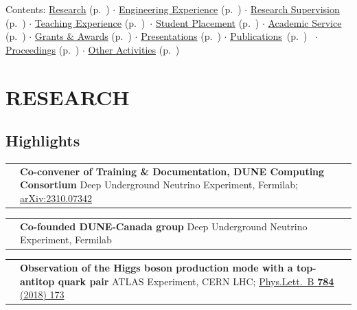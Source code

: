 \documentclass[a4paper,11pt,oneside]{article}
\makeatletter
\newcommand{\light}[1]{\textcolor{cvgray}{{\small #1}}}
\newlength{\datecol}\setlength{\datecol}{2.3cm}
\newlength{\contentcol}
\newlength{\supdatecol}\setlength{\supdatecol}{2cm}
\newlength{\supcontentcol}
\newcommand{\suprow}[2]{%
  \begingroup
  \arrayrulecolor{cvblue}%
  \setlength{\arrayrulewidth}{0.5pt}%
  \setlength{\extrarowheight}{0.5pt}%
  \noindent\begin{tabular}{@{}%
      >{\centering\arraybackslash}m{\supdatecol}%
      @{\hspace{6pt}}|@{\hspace{8pt}}%
      >{\arraybackslash}m{\supcontentcol}@{}}
    {\small #1} & #2
  \end{tabular}%
  \endgroup
  \vspace{7pt}\par}
\newcommand{\h}[1]{\vspace{10pt}\subsection{#1}}
\makeatother
\begin{document}
\vfill
{\small
{\color{cvgray}Contents:} \hyperref[sec:research]{Research} (p.~\underline{\hyperref[sec:research]{\pageref{sec:research}}}) {\small$\cdot$}
\hyperref[sec:engineering]{Engineering Experience} (p.~\underline{\hyperref[sec:engineering]{\pageref{sec:engineering}}}) {\small$\cdot$}
\hyperref[sec:supervision]{Research Supervision} (p.~\underline{\hyperref[sec:supervision]{\pageref{sec:supervision}}}) {\small$\cdot$}
\hyperref[sec:teaching]{Teaching Experience} (p.~\underline{\hyperref[sec:teaching]{\pageref{sec:teaching}}})~{\small$\cdot$}
\hyperref[sec:mentoring]{Student Placement} (p.~\underline{\hyperref[sec:mentoring]{\pageref{sec:mentoring}}}) {\small$\cdot$}
\hyperref[sec:service]{Academic Service} (p.~\underline{\hyperref[sec:service]{\pageref{sec:service}}}) {\small$\cdot$}
\hyperref[sec:grants]{Grants \& Awards} (p.~\underline{\hyperref[sec:grants]{\pageref{sec:grants}}}) {\small$\cdot$}
\hyperref[sec:presentations]{Presentations} (p.~\underline{\hyperref[sec:presentations]{\pageref{sec:presentations}}}) {\small$\cdot$}
\hyperref[sec:publications]{Publications}~(p.~\underline{\hyperref[sec:publications]{\pageref{sec:publications}}})
~{\small$\cdot$}
\hyperref[sec:proceedings]{Proceedings} (p.~\underline{\hyperref[sec:proceedings]{\pageref{sec:proceedings}}}) {\small$\cdot$}
\hyperref[sec:other]{Other Activities} (p.~\underline{\hyperref[sec:other]{\pageref{sec:other}}})%
}

\section{RESEARCH}
\label{sec:research}

\h{Highlights}

\suprow{2020\,--\,2022}{%
  \textbf{Co-convener of Training \& Documentation, DUNE Computing Consortium}\newline
  \light{Deep Underground Neutrino Experiment, Fermilab; \href{https://doi.org/10.48550/arXiv.2310.07342}{arXiv:2310.07342}}%
}

\suprow{2019}{%
  \textbf{Co-founded DUNE-Canada group}\newline
  \light{Deep Underground Neutrino Experiment, Fermilab}%
}

\suprow{2018}{%
  \textbf{Observation of the Higgs boson production mode with a top-antitop quark pair}\newline
  \light{ATLAS Experiment, CERN LHC; \href{https://doi.org/10.1016/j.physletb.2018.07.035}{Phys.Lett.\ B \textbf{784} (2018) 173}}%
}
\end{document}

